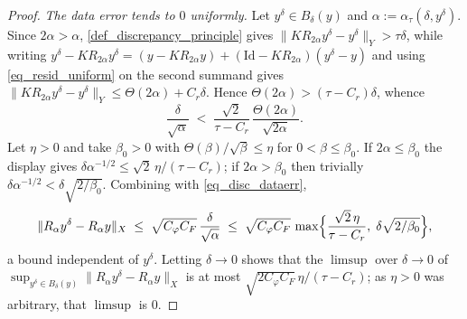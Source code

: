 \documentclass[a4paper]{report}
\theoremstyle{plain}
\theoremstyle{definition}
\theoremstyle{remark}
\newcommand{\Id}{\mathrm{Id}}
\begin{document}
\begin{proof}
  \emph{The data error tends to $0$ uniformly.}  Let $y^{\delta} \in B_{\delta}(y)$ and
  $\alpha := \alpha_{\tau}(\delta,y^{\delta})$.  Since $2\alpha > \alpha$,
  \cref{def_discrepancy_principle} gives $\|KR_{2\alpha}y^{\delta} - y^{\delta}\|_Y >
  \tau\delta$, while writing $y^{\delta} - KR_{2\alpha}y^{\delta} = (y - KR_{2\alpha}y)
  + (\Id - KR_{2\alpha})(y^{\delta}-y)$ and using \eqref{eq_resid_uniform} on the second
  summand gives $\|KR_{2\alpha}y^{\delta} - y^{\delta}\|_Y \le \Theta(2\alpha) +
  C_r\delta$.  Hence $\Theta(2\alpha) > (\tau - C_r)\delta$, whence
  \[
    \frac{\delta}{\sqrt{\alpha}} \;<\; \frac{\sqrt{2}}{\tau - C_r}\,
      \frac{\Theta(2\alpha)}{\sqrt{2\alpha}} .
  \]
  Let $\eta > 0$ and take $\beta_0 > 0$ with $\Theta(\beta)/\sqrt{\beta} \le \eta$ for
  $0 < \beta \le \beta_0$.  If $2\alpha \le \beta_0$ the display gives
  $\delta\alpha^{-1/2} \le \sqrt{2}\,\eta/(\tau - C_r)$; if $2\alpha > \beta_0$ then
  trivially $\delta\alpha^{-1/2} < \delta\sqrt{2/\beta_0}$.  Combining with
  \eqref{eq_disc_dataerr},
  \[
    \|R_{\alpha}y^{\delta} - R_{\alpha}y\|_X \;\le\;
      \sqrt{C_{\varphi}C_F}\,\frac{\delta}{\sqrt{\alpha}} \;\le\;
      \sqrt{C_{\varphi}C_F}\,\max\Bigl\{\frac{\sqrt{2}\,\eta}{\tau - C_r},\;
        \delta\sqrt{2/\beta_0}\Bigr\} ,
  \]
  a bound independent of $y^{\delta}$.  Letting $\delta \to 0$ shows that the
  $\limsup$ over $\delta \to 0$ of $\sup_{y^{\delta} \in B_{\delta}(y)}
  \|R_{\alpha}y^{\delta} - R_{\alpha}y\|_X$ is at most
  $\sqrt{2C_{\varphi}C_F}\,\eta/(\tau - C_r)$; as $\eta > 0$ was arbitrary, that
  $\limsup$ is $0$.


\end{proof}
\end{document}
